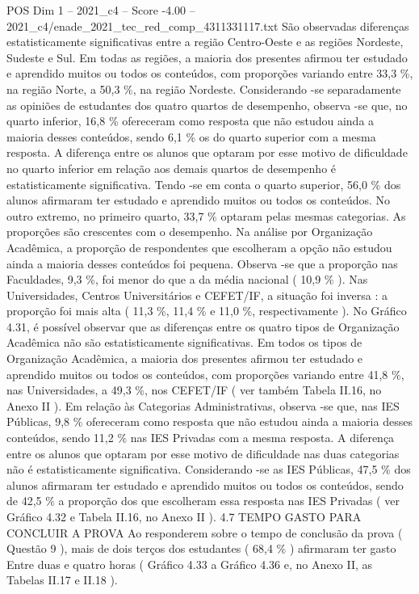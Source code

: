 \begin{textsample}{POS Dim 1 – 2021\_c4 – Score -4.00 – 2021\_c4/enade\_2021\_tec\_red\_comp\_4311331117.txt}
São observadas diferenças estatisticamente significativas entre a região Centro-Oeste e as regiões Nordeste, Sudeste e Sul.
Em todas as regiões, a maioria dos presentes afirmou ter estudado e aprendido muitos ou todos os conteúdos, com proporções variando entre 33,3 \%, na região Norte, a 50,3 \%, na região Nordeste.
Considerando -se separadamente as opiniões de estudantes dos quatro quartos de desempenho, observa -se que, no quarto inferior, 16,8 \% ofereceram como resposta que não estudou ainda a maioria desses conteúdos, sendo 6,1 \% os do quarto superior com a mesma resposta.
A diferença entre os alunos que optaram por esse motivo de dificuldade no quarto inferior em relação aos demais quartos de desempenho é estatisticamente significativa.
Tendo -se em conta o quarto superior, 56,0 \% dos alunos afirmaram ter estudado e aprendido muitos ou todos os conteúdos.
No outro extremo, no primeiro quarto, 33,7 \% optaram pelas mesmas categorias.
As proporções são crescentes com o desempenho.
Na análise por Organização Acadêmica, a proporção de respondentes que escolheram a opção não estudou ainda a maioria desses conteúdos foi pequena.
Observa -se que a proporção nas Faculdades, 9,3 \%, foi menor do que a da média nacional ( 10,9 \% ).
Nas Universidades, Centros Universitários e CEFET/IF, a situação foi inversa : a proporção foi mais alta ( 11,3 \%, 11,4 \% e 11,0 \%, respectivamente ).
No Gráfico 4.31, é possível observar que as diferenças entre os quatro tipos de Organização Acadêmica não são estatisticamente significativas.
Em todos os tipos de Organização Acadêmica, a maioria dos presentes afirmou ter estudado e aprendido muitos ou todos os conteúdos, com proporções variando entre 41,8 \%, nas Universidades, a 49,3 \%, nos CEFET/IF ( ver também Tabela II.16, no Anexo II ).
Em relação às Categorias Administrativas, observa -se que, nas IES Públicas, 9,8 \% ofereceram como resposta que não estudou ainda a maioria desses conteúdos, sendo 11,2 \% nas IES Privadas com a mesma resposta.
A diferença entre os alunos que optaram por esse motivo de dificuldade nas duas categorias não é estatisticamente significativa.
Considerando -se as IES Públicas, 47,5 \% dos alunos afirmaram ter estudado e aprendido muitos ou todos os conteúdos, sendo de 42,5 \% a proporção dos que escolheram essa resposta nas IES Privadas ( ver Gráfico 4.32 e Tabela II.16, no Anexo II ). 4.7 TEMPO GASTO PARA CONCLUIR A PROVA Ao responderem sobre o tempo de conclusão da prova ( Questão 9 ), mais de dois terços dos estudantes ( 68,4 \% ) afirmaram ter gasto Entre duas e quatro horas ( Gráfico 4.33 a Gráfico 4.36 e, no Anexo II, as Tabelas II.17 e II.18 ).

\end{textsample}

